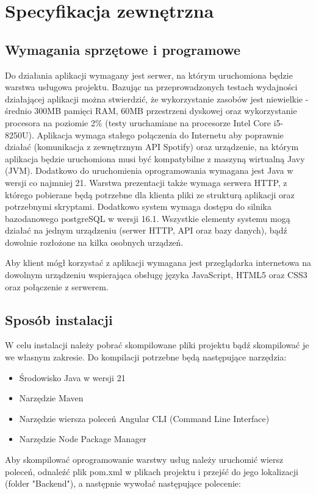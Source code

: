 \chapter{Specyfikacja zewnętrzna}
\label{ch:04}
\section{Wymagania sprzętowe i programowe}
Do działania aplikacji wymagany jest serwer, na którym uruchomiona będzie warstwa usługowa projektu. Bazując na przeprowadzonych testach wydajności działającej aplikacji można stwierdzić, że wykorzystanie zasobów jest niewielkie - średnio 300MB pamięci RAM, 60MB przestrzeni dyskowej oraz wykorzystanie procesora na poziomie 2\% (testy uruchamiane na procesorze Intel Core i5-8250U). Aplikacja wymaga stałego połączenia do Internetu aby poprawnie działać (komunikacja z zewnętrznym API Spotify) oraz urządzenie, na którym aplikacja będzie uruchomiona musi być kompatybilne z maszyną wirtualną Javy (JVM). Dodatkowo do uruchomienia oprogramowania wymagana jest Java w wersji co najmniej 21. Warstwa prezentacji także wymaga serwera HTTP, z którego pobierane będą potrzebne dla klienta pliki ze strukturą aplikacji oraz potrzebnymi skryptami. Dodatkowo system wymaga dostępu do silnika bazodanowego postgreSQL w wersji 16.1. Wszystkie elementy systemu mogą działać na jednym urządzeniu (serwer HTTP, API oraz bazy danych), bądź dowolnie rozłożone na kilka osobnych urządzeń.

Aby klient mógł korzystać z aplikacji wymagana jest przeglądarka internetowa na dowolnym urządzeniu wspierająca obsługę języka JavaScript, HTML5 oraz CSS3 oraz połączenie z serwerem.

\section{Sposób instalacji}
W celu instalacji należy pobrać skompilowane pliki projektu bądź skompilować je we własnym zakresie. Do kompilacji potrzebne będą następujące narzędzia: 
\begin{itemize}
\item Środowisko Java w wersji 21
\item Narzędzie Maven
\item Narzędzie wiersza poleceń Angular CLI (Command Line Interface)
\item Narzędzie Node Package Manager
\end{itemize}

Aby skompilować oprogramowanie warstwy usług należy uruchomić wiersz poleceń, odnaleźć plik pom.xml w plikach projektu i przejść do jego lokalizacji (folder "Backend"), a następnie wywołać następujące polecenie: 

